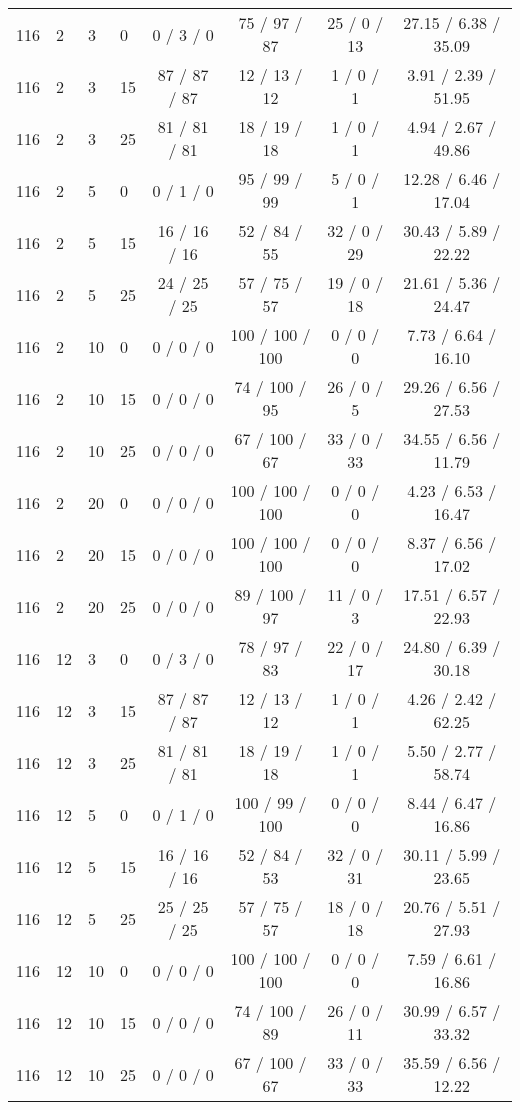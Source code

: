 \begin{table}[p]
\begin{tabular}{llllcccc}
116 & 2 & 3 & 0 & 0 / 3 / 0 & 75 / 97 / 87 & 25 / 0 / 13 & 27.15 / 6.38 / 35.09 \\
116 & 2 & 3 & 15 & 87 / 87 / 87 & 12 / 13 / 12 & 1 / 0 / 1 & 3.91 / 2.39 / 51.95 \\
116 & 2 & 3 & 25 & 81 / 81 / 81 & 18 / 19 / 18 & 1 / 0 / 1 & 4.94 / 2.67 / 49.86 \\
116 & 2 & 5 & 0 & 0 / 1 / 0 & 95 / 99 / 99 & 5 / 0 / 1 & 12.28 / 6.46 / 17.04 \\
116 & 2 & 5 & 15 & 16 / 16 / 16 & 52 / 84 / 55 & 32 / 0 / 29 & 30.43 / 5.89 / 22.22 \\
116 & 2 & 5 & 25 & 24 / 25 / 25 & 57 / 75 / 57 & 19 / 0 / 18 & 21.61 / 5.36 / 24.47 \\
116 & 2 & 10 & 0 & 0 / 0 / 0 & 100 / 100 / 100 & 0 / 0 / 0 & 7.73 / 6.64 / 16.10 \\
116 & 2 & 10 & 15 & 0 / 0 / 0 & 74 / 100 / 95 & 26 / 0 / 5 & 29.26 / 6.56 / 27.53 \\
116 & 2 & 10 & 25 & 0 / 0 / 0 & 67 / 100 / 67 & 33 / 0 / 33 & 34.55 / 6.56 / 11.79 \\
116 & 2 & 20 & 0 & 0 / 0 / 0 & 100 / 100 / 100 & 0 / 0 / 0 & 4.23 / 6.53 / 16.47 \\
116 & 2 & 20 & 15 & 0 / 0 / 0 & 100 / 100 / 100 & 0 / 0 / 0 & 8.37 / 6.56 / 17.02 \\
116 & 2 & 20 & 25 & 0 / 0 / 0 & 89 / 100 / 97 & 11 / 0 / 3 & 17.51 / 6.57 / 22.93 \\
116 & 12 & 3 & 0 & 0 / 3 / 0 & 78 / 97 / 83 & 22 / 0 / 17 & 24.80 / 6.39 / 30.18 \\
116 & 12 & 3 & 15 & 87 / 87 / 87 & 12 / 13 / 12 & 1 / 0 / 1 & 4.26 / 2.42 / 62.25 \\
116 & 12 & 3 & 25 & 81 / 81 / 81 & 18 / 19 / 18 & 1 / 0 / 1 & 5.50 / 2.77 / 58.74 \\
116 & 12 & 5 & 0 & 0 / 1 / 0 & 100 / 99 / 100 & 0 / 0 / 0 & 8.44 / 6.47 / 16.86 \\
116 & 12 & 5 & 15 & 16 / 16 / 16 & 52 / 84 / 53 & 32 / 0 / 31 & 30.11 / 5.99 / 23.65 \\
116 & 12 & 5 & 25 & 25 / 25 / 25 & 57 / 75 / 57 & 18 / 0 / 18 & 20.76 / 5.51 / 27.93 \\
116 & 12 & 10 & 0 & 0 / 0 / 0 & 100 / 100 / 100 & 0 / 0 / 0 & 7.59 / 6.61 / 16.86 \\
116 & 12 & 10 & 15 & 0 / 0 / 0 & 74 / 100 / 89 & 26 / 0 / 11 & 30.99 / 6.57 / 33.32 \\
116 & 12 & 10 & 25 & 0 / 0 / 0 & 67 / 100 / 67 & 33 / 0 / 33 & 35.59 / 6.56 / 12.22 \\

\end{tabular}
\end{table}
